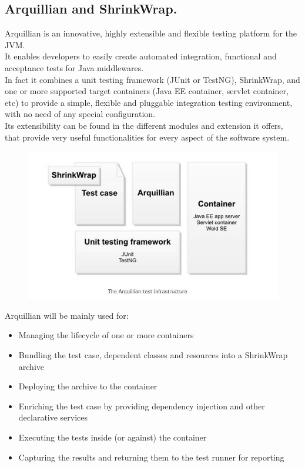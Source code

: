 \documentclass[18pt,oneside,a4paper, titlepage]{article}
\begin{document}
	\subsection{Arquillian and ShrinkWrap.}
	Arquillian is an innovative, highly extensible and flexible testing platform for the JVM.\\ It enables developers to easily create automated integration, functional and acceptance tests for Java middlewares. \\In fact it combines a unit testing framework (JUnit or TestNG), ShrinkWrap, and one or more supported target containers (Java EE container, servlet container, etc) to provide a simple, flexible and pluggable integration testing environment, with no need of any special configuration.\\
	Its extensibility can be found in the different modules and extension it offers, that provide very useful functionalities for every aspect of the software system.
	\vspace{0.5cm}
	\begin{figure}[h]
		\centering
		\includegraphics[scale=0.55]{Arquillian.jpg}
	\end{figure}
		
	\vspace{0.5cm}
	\newpage
	Arquillian will be mainly used for:
	\begin{itemize}
		\item Managing the lifecycle of one or more containers
		\item Bundling the test case, dependent classes and resources into a ShrinkWrap archive
		\item Deploying the archive to the container
		\item Enriching the test case by providing dependency injection and other declarative services
		\item Executing the tests inside (or against) the container
		\item Capturing the results and returning them to the test runner for reporting
	\end{itemize}
	
\end{document}
